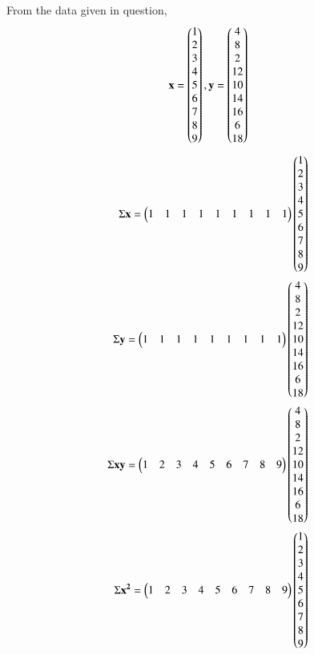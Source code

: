 \documentclass[journal,12pt,twocolumn]{IEEEtran}
\begin{document}
From the data given in question,
\begin{align}
  \mathbf{x} = \begin{pmatrix}1 \\ 2 \\ 3 \\ 4 \\ 5 \\ 6 \\ 7 \\ 8 \\ 9\end{pmatrix},
  \mathbf{y} = \begin{pmatrix}4 \\ 8 \\ 2 \\ 12 \\ 10 \\ 14 \\ 16 \\ 6 \\ 18\end{pmatrix}
\end{align}
\begin{align}
    \Sigma \mathbf{x} 
    = \begin{pmatrix}1 & 1 & 1 & 1 & 1 & 1 & 1 & 1 & 1\end{pmatrix} \begin{pmatrix}1 \\ 2 \\ 3 \\ 4 \\ 5 \\ 6 \\ 7 \\ 8 \\ 9\end{pmatrix}\\
    \Sigma \mathbf{y} = \begin{pmatrix}1 & 1 & 1 & 1 & 1 & 1 & 1 & 1 & 1\end{pmatrix} \begin{pmatrix}4 \\ 8 \\ 2 \\ 12 \\ 10 \\ 14 \\ 16 \\ 6 \\ 18\end{pmatrix}\\
    \Sigma \mathbf{x}\mathbf{y} = \begin{pmatrix}1 & 2 & 3 & 4 & 5 & 6 & 7 & 8 & 9\end{pmatrix} \begin{pmatrix}4 \\ 8 \\ 2 \\ 12 \\ 10 \\ 14 \\ 16 \\ 6 \\ 18\end{pmatrix}\\
    \Sigma \mathbf{x^2} = \begin{pmatrix}1 & 2 & 3 & 4 & 5 & 6 & 7 & 8 & 9\end{pmatrix} \begin{pmatrix}1 \\ 2 \\ 3 \\ 4 \\ 5 \\ 6 \\ 7 \\ 8 \\ 9\end{pmatrix}
\end{align}
\end{document}
